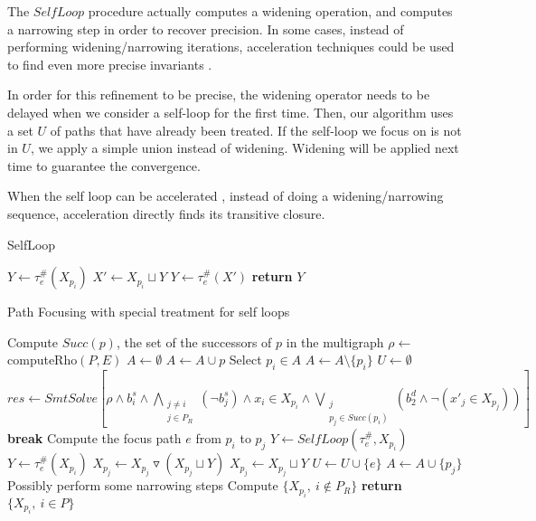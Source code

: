 \documentclass[a4paper,english,titlepage,11pt]{report}
\newcommand{\widening}{\mathop{\triangledown}}
\begin{document}
	The $SelfLoop$ procedure actually computes a widening operation, and
	computes a narrowing step in order to recover precision. In some cases,
	instead of performing widening/narrowing iterations, 
	acceleration techniques could be used 
	to find even more precise invariants \cite{GH06}.

	In order for this refinement to be precise, the widening
	operator needs to be delayed
	when we consider a self-loop for the first time. Then, our
	algorithm uses a set $U$ of paths that have already been treated. If the
	self-loop we focus on is not in $U$, we apply a simple union instead of
	widening. Widening will be applied next time to guarantee the convergence.

	When the self loop can be accelerated \cite{Gon07}, instead of doing a
	widening/narrowing sequence,  acceleration directly finds
	its transitive closure.

\begin{algorithm}
\caption{SelfLoop}
\label{loopiteralgo}
\begin{algorithmic}[1] 
	\State $Y \gets \tau_e^\#(X_{p_i})$
	\State $X' \gets X_{p_i} \sqcup Y$
	\State $Y \gets \tau_e^\#(X')$
	\State \textbf{return} $Y$
\EndProcedure
\end{algorithmic}
\end{algorithm}

\begin{algorithm}
\caption{Path Focusing with special treatment for self loops}
\label{pathfocusingoptalgo}
\begin{algorithmic}[1] 
	\State Compute $Succ(p)$, the set of the successors of $p$ in the multigraph
\EndFor
\State $\rho \gets$ computeRho$(P,E)$
\State $A \gets \emptyset$
	\State $A \gets A \cup p$
\EndFor
{}
	\State Select $p_i \in A$
	\State $A \gets A \setminus \{p_i\}$
	\State $U \gets \emptyset$
		\State $res \gets SmtSolve\left[\rho \wedge b_i^s \wedge
		\displaystyle\bigwedge_{\substack{j\neq i \\
		j\in P_R}} (\neg b_j^s) \wedge x_i \in X_{p_i} \wedge
		\bigvee_{\substack{j \\ p_j\in Succ(p_i)}} \left(b_2^d \wedge \neg (x'_j \in
		X_{p_j})\right)\right]$
			\State \textbf{break}
		\EndIf
		\State Compute the focus path $e$ from $p_i$ to $p_j$
			\State $Y \gets SelfLoop(\tau_e^\#,X_{p_i})$
		\Else
			\State $Y \gets \tau_e^\#(X_{p_i})$
		\EndIf
			\State $X_{p_j} \gets X_{p_j} \widening (X_{p_j} \sqcup Y)$
		\Else
			\State $X_{p_j} \gets X_{p_j} \sqcup Y$
			\State $U \gets U \cup \{e\}$
		\EndIf
		\State $A \gets A \cup \{p_j\}$
	\EndWhile
\EndWhile
\State Possibly perform some narrowing steps
\State Compute $\{X_{p_i},\ i \notin P_R\}$
\State \textbf{return} $\{X_{p_i},\ i \in P\}$
\EndProcedure
\end{algorithmic}
\end{algorithm}
	
\end{document}
